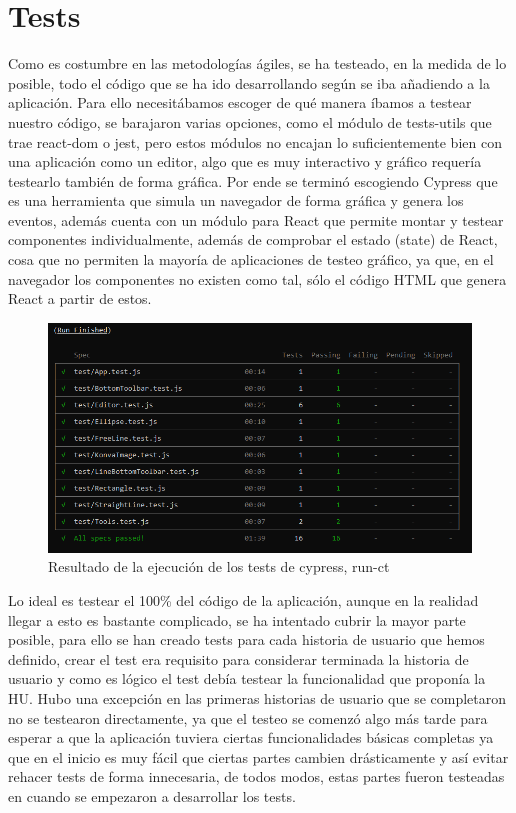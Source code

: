\newpage
\section{Tests}

Como es costumbre en las metodologías ágiles, se ha testeado, en la medida de lo posible,
todo el código que se ha ido desarrollando según se iba añadiendo a la aplicación.
Para ello necesitábamos escoger de qué manera íbamos a testear nuestro código, se barajaron
varias opciones, como el módulo de tests-utils que trae react-dom \cite{react-dom} o jest, 
pero estos módulos no encajan lo suficientemente bien con una aplicación como un editor, 
algo que es muy interactivo y gráfico requería testearlo también de forma gráfica. Por ende
se terminó escogiendo Cypress \cite{cypress} que es una herramienta que simula un navegador de
forma gráfica y genera los eventos, además cuenta con un módulo para React \cite{cypressReact} que permite montar
y testear componentes individualmente, además de comprobar el estado (state) de React, cosa
que no permiten la mayoría de aplicaciones de testeo gráfico, ya que, en el navegador los
componentes no existen como tal, sólo el código HTML que genera React a partir de estos.

\begin{figure}[!h]
  \centering
  \includegraphics[scale=0.6]{img/TestsOK.png}
  \caption{Resultado de la ejecución de los tests de cypress, run-ct}
\end{figure}

Lo ideal es testear el 100\% del código de la aplicación, aunque en la realidad llegar a esto
es bastante complicado, se ha intentado cubrir la mayor parte posible, para ello se han creado
tests para cada historia de usuario que hemos definido, crear el test era requisito para considerar
terminada la historia de usuario y como es lógico el test debía testear la funcionalidad que 
proponía la HU. Hubo una excepción en las primeras historias de usuario que se completaron
no se testearon directamente, ya que el testeo se comenzó algo más tarde para esperar a 
que la aplicación tuviera ciertas funcionalidades básicas completas ya que en el inicio es
muy fácil que ciertas partes cambien drásticamente y así evitar rehacer tests de forma innecesaria,
de todos modos, estas partes fueron testeadas en cuando se empezaron a desarrollar los tests.

